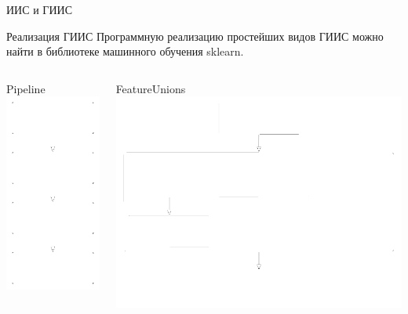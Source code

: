 \documentclass{beamer}
\begin{document}
\begin{darkframes}
\begin{frame}{ИИС и ГИИС}
\begin{block}{}
			\end{block}
		\end{frame}

		\begin{frame}{Реализация ГИИС}
			\centering
			Программную реализацию простейших видов ГИИС можно найти в библиотеке машинного обучения sklearn.
			\begin{columns}[onlytextwidth]
				\begin{column}{0.48\columnwidth}
					\centering

					Pipeline\\
					\includegraphics[width=0.23\paperwidth]{resources/linear}

				\end{column}

				\begin{column}{0.48\columnwidth}
					\centering

					FeatureUnions\\
					\includegraphics[width=0.4\paperwidth]{resources/parallel}
				\end{column}
			\end{columns}


\end{frame}
\end{darkframes}
\end{document}
